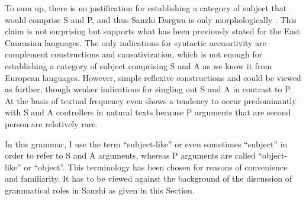To sum up, there is no justification for establishing a category of  subject that would comprise S and P, and thus Sanzhi Dargwa is only morphologically . This claim is not surprising but supports what has been previously stated for the East Caucasian languages. The only indications for syntactic accusativity are complement constructions and causativization, which is not enough for establishing a category of subject comprising S and A as we know it from European languages. However, simple reflexive constructions and  could be viewed as further, though weaker indications for singling out S and A in contrast to P. At the basis of textual frequency even  shows a tendency to occur predominantly with S and A controllers in natural texts because P arguments that are second person are relatively rare. 

In this grammar, I use the term ``subject-like'' or even sometimes ``subject'' in order to refer to S and A arguments, whereas P arguments are called ``object-like'' or ``object''. This terminology has been chosen for reasons of convenience and familiarity. It has to be viewed against the background of the discussion of grammatical roles in Sanzhi as given in this Section.


